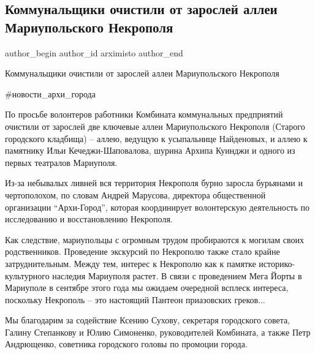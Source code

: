  
 
 
 
 

\subsection{Коммунальщики очистили от зарослей аллеи Мариупольского Некрополя}
\label{sec:11_08_2021.fb.arximisto.1.kommunalschiki_ochistili_ot_zaroslej_allei_nekropolja}

\ifcmt
 author_begin
   author_id arximisto
 author_end
\fi

Коммунальщики очистили от зарослей аллеи Мариупольского Некрополя

\#новости\_архи\_города

По просьбе волонтеров работники Комбината коммунальных предприятий очистили от
зарослей две ключевые аллеи Мариупольского Некрополя (Старого городского
кладбища) – аллею, ведущую к усыпальнице Найденовых, и аллею к памятнику Ильи
Кечеджи-Шаповалова, шурина Архипа Куинджи и одного из первых театралов
Мариуполя.

Из-за небывалых ливней вся территория Некрополя бурно заросла бурьянами и
чертополохом, по словам Андрей Марусова, директора общественной организации
\enquote{Архи-Город}, которая координирует волонтерскую деятельность по исследованию и
восстановлению Некрополя. 

Как следствие, мариупольцы с огромным трудом пробираются к могилам своих
родственников. Проведение экскурсий по Некрополю также стало крайне
затруднительным. Между тем, интерес к Некрополю как к памятке
историко-культурного наследия Мариуполя растет. В связи с проведением Мега
Йорты в Мариуполе в сентябре этого года мы ожидаем очередной всплеск интереса,
поскольку Некрополь – это настоящий Пантеон приазовских греков...

Мы благодарим за содействие Ксению Сухову, секретаря городского совета, Галину
Степанкову и Юлию Симоненко, руководителей Комбината, а также Петр Андрющенко,
советника городского головы по промоции города.
